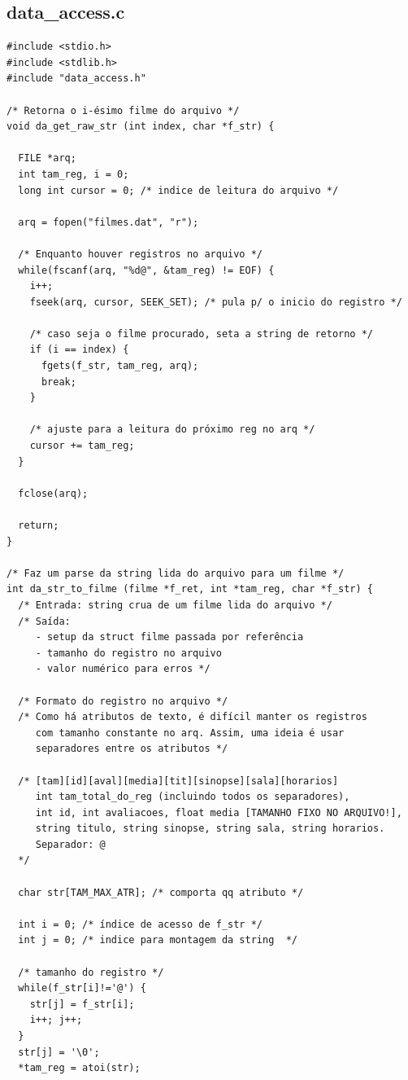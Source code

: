 \documentclass[11pt,twoside]{article}
\begin{document}
\subsection{data\_access.c}
\begin{verbatim}
#include <stdio.h>
#include <stdlib.h>
#include "data_access.h"

/* Retorna o i-ésimo filme do arquivo */
void da_get_raw_str (int index, char *f_str) {
  
  FILE *arq;
  int tam_reg, i = 0;
  long int cursor = 0; /* indice de leitura do arquivo */

  arq = fopen("filmes.dat", "r");

  /* Enquanto houver registros no arquivo */
  while(fscanf(arq, "%d@", &tam_reg) != EOF) {
    i++;
    fseek(arq, cursor, SEEK_SET); /* pula p/ o inicio do registro */

    /* caso seja o filme procurado, seta a string de retorno */
    if (i == index) {
      fgets(f_str, tam_reg, arq);
      break;
    }

    /* ajuste para a leitura do próximo reg no arq */
    cursor += tam_reg; 
  }
  
  fclose(arq);
  
  return;
}

/* Faz um parse da string lida do arquivo para um filme */
int da_str_to_filme (filme *f_ret, int *tam_reg, char *f_str) {
  /* Entrada: string crua de um filme lida do arquivo */
  /* Saída:
     - setup da struct filme passada por referência 
     - tamanho do registro no arquivo
     - valor numérico para erros */

  /* Formato do registro no arquivo */
  /* Como há atributos de texto, é difícil manter os registros 
     com tamanho constante no arq. Assim, uma ideia é usar 
     separadores entre os atributos */

  /* [tam][id][aval][media][tit][sinopse][sala][horarios]
     int tam_total_do_reg (incluindo todos os separadores), 
     int id, int avaliacoes, float media [TAMANHO FIXO NO ARQUIVO!], 
     string titulo, string sinopse, string sala, string horarios.
     Separador: @
  */

  char str[TAM_MAX_ATR]; /* comporta qq atributo */

  int i = 0; /* índice de acesso de f_str */
  int j = 0; /* indice para montagem da string  */

  /* tamanho do registro */
  while(f_str[i]!='@') {
    str[j] = f_str[i];
    i++; j++;
  }
  str[j] = '\0';
  *tam_reg = atoi(str);


\end{verbatim}
\end{document}
